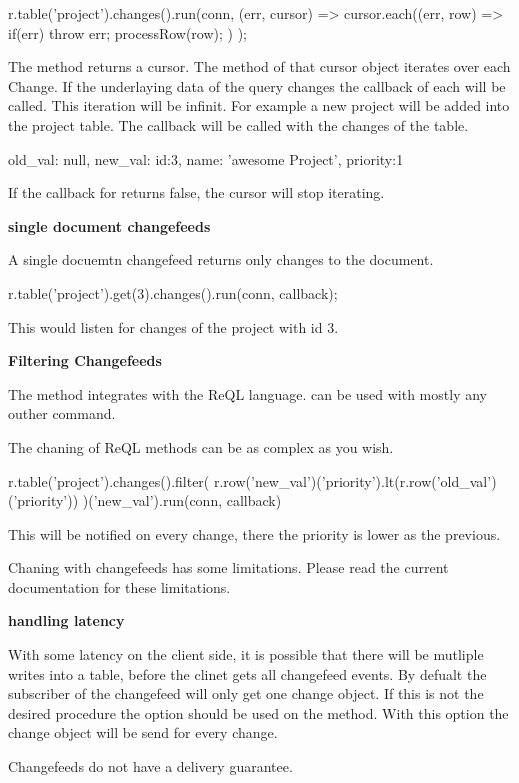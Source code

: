\begin{2stlisting}[frame=single, caption=example usage, label=refdoc]
r.table('project').changes().run(conn, (err, cursor) => {
	cursor.each((err, row) => {
		if(err) throw err;
		processRow(row);
	})
});
\end{2stlisting}

The  method returns a cursor.
The  method of that cursor object iterates over each Change.
If the underlaying data of the query changes the callback of each will be called.
This iteration will be infinit.
For example a new project will be added  into the project table.
The  callback will be called with the changes of the table.

\begin{3stlisting}[frame=single, caption=example usage, label=refdoc]
{
	old_val: null,
	new_val: {id:3, name: 'awesome Project', priority:1}
}
\end{3stlisting}

If the callback for  returns false, the cursor will stop iterating.

\textbf{single document changefeeds}

A single docuemtn changefeed returns only changes to the document.

\begin{4stlisting}[frame=single, caption=example usage, label=refdoc]
r.table('project').get(3).changes().run(conn, callback);
\end{4stlisting}

This would listen for changes of the project with id 3.

\textbf{Filtering Changefeeds}

The method  integrates with the ReQL language.
 can be used with mostly any outher command.

The chaning of ReQL methods can be as complex as you wish.

\begin{5stlisting}[frame=single, caption=example usage, label=refdoc]
r.table('project').changes().filter(
    r.row('new_val')('priority').lt(r.row('old_val')('priority'))
)('new_val').run(conn, callback)
\end{5stlisting}

This will be notified on every change, there the priority is lower as the previous.

Chaning with changefeeds has some limitations.
Please read the current documentation for these limitations.

\textbf{handling latency}

With some latency on the client side, it is possible that there will be mutliple writes into a table, before the clinet gets all changefeed events.
By defualt the subscriber of the changefeed will only get one change object.
If this is not the desired procedure the option  should be used on the  method.
With this option the change object will be send for every change.

Changefeeds do not have a delivery guarantee.

